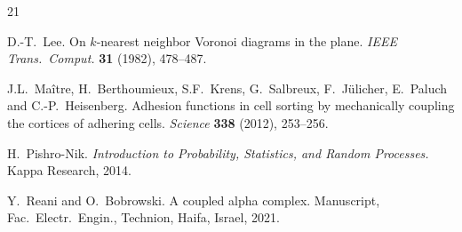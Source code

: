 \documentclass[a4paper]{article}
\theoremstyle{definition}
\numberwithin{theorem}{section}
\numberwithin{equation}{section}
\begin{document}
\begin{thebibliography}{21}
{%

{\sc D.-T.\ Lee.}
On $k$-nearest neighbor Voronoi diagrams in the plane.
\emph{IEEE Trans.\ Comput.} {\bf 31} (1982), 478--487.

{\sc J.L.\ Maître, H.\ Berthoumieux, S.F.\ Krens, G.\ Salbreux, F.\ Jülicher, E.\ Paluch and C.-P.\ Heisenberg.}
Adhesion functions in cell sorting by mechanically coupling the cortices of adhering cells.
\emph{Science} {\bf 338} (2012), 253--256.

{\sc H.\ Pishro-Nik.}
\emph{Introduction to Probability, Statistics, and Random Processes.}
Kappa Research, 2014.

{\sc Y.\ Reani and O.\ Bobrowski.}
A coupled alpha complex.
Manuscript, Fac.\ Electr.\ Engin., Technion, Haifa, Israel, 2021.


}
\end{thebibliography}
\end{document}
